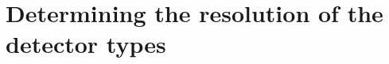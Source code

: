 \appendix

\section{Determining the resolution of the detector types}
\label{sec:ResDetermination}




